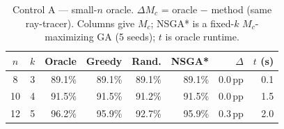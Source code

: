 \begin{table}[t]
\centering
\caption{Control A — small-$n$ oracle. $\Delta M_c$ = oracle $-$ method (same ray-tracer). Columns give $M_c$; NSGA* is a fixed-$k$ $M_c$-maximizing GA (5 seeds); $t$ is oracle runtime.}
\label{tab:oracle_comparison}
\footnotesize
\setlength{\tabcolsep}{3pt}
\begin{tabular}{ccrrrrrr}
\toprule
$n$ & $k$ & Oracle & Greedy & Rand. & NSGA* & $\Delta$ & $t$ (s) \\
\midrule
8 & 3 & 89.1\% & 89.1\% & 89.1\% & 89.1\% & 0.0\,pp & 0.1 \\
10 & 4 & 91.5\% & 91.5\% & 91.2\% & 91.5\% & 0.0\,pp & 1.5 \\
12 & 5 & 96.2\% & 95.9\% & 92.7\% & 95.9\% & 0.3\,pp & 2.0 \\
\bottomrule
\end{tabular}
\end{table}
